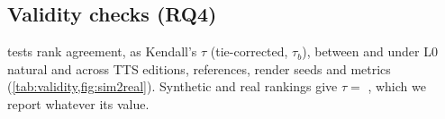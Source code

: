 \subsection{Validity checks (RQ4)}\label{sec:exp-validity}

 tests rank agreement, as Kendall's $\tau$ (tie-corrected, $\tau_b$), between \taxi and \syn {} under L0 natural and across TTS editions, references, render seeds and metrics (\cref{tab:validity,fig:sim2real}).
Synthetic and real rankings give $\tau=$ \tbdtext{}, which we report whatever its value.
